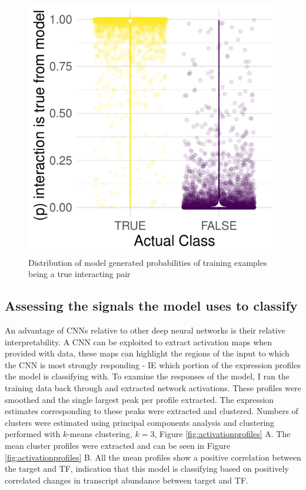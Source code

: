 \documentclass[12pt,a4paper,]{article}
\begin{document}
\begin{figure}
\centering
\includegraphics{../analysis/figure3.pdf}
\caption{\label{fig:prob}Distribution of model generated probabilities of training examples being a true interacting pair}
\end{figure}

\hypertarget{assessing-the-signals-the-model-uses-to-classify}{%
\subsection{Assessing the signals the model uses to classify}\label{assessing-the-signals-the-model-uses-to-classify}}

An advantage of CNNs relative to other deep neural networks is their relative interpretability. A CNN can be exploited to extract activation maps when provided with data, these maps can highlight the regions of the input to which the CNN is most strongly responding - IE which portion of the expression profiles the model is classifying with. To examine the responses of the model, I ran the training data back through and extracted network activations. These profiles were smoothed and the single largest peak per profile extracted. The expression estimates corresponding to these peaks were extracted and clustered. Numbers of clusters were estimated using principal components analysis and clustering performed with \(k\)-means clustering, \(k = 3\), Figure \ref{fig:activationprofiles} A. The mean cluster profiles were extracted and can be seen in Figure \ref{fig:activationprofiles} B. All the mean profiles show a positive correlation between the target and TF, indication that this model is classifying based on positively correlated changes in transcript abundance between target and TF.
\end{document}
